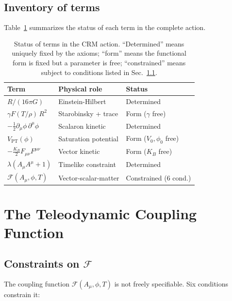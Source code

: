\documentclass[aps,prd,twocolumn,superscriptaddress,nofootinbib]{revtex4-2}
\begin{document}
\subsection{Inventory of terms}

Table~\ref{tab:terms} summarizes the status of each term in the complete action.

\begin{table}[b]
\caption{\label{tab:terms}Status of terms in the CRM action. ``Determined'' means uniquely fixed by the axioms; ``form'' means the functional form is fixed but a parameter is free; ``constrained'' means subject to conditions listed in Sec.~\ref{sec:constraints}.}
\begin{ruledtabular}
\begin{tabular}{lll}
Term & Physical role & Status \\
\hline
$R/(16\pi G)$ & Einstein-Hilbert & Determined \\
$\gamma F(T/\rho)\,R^2$ & Starobinsky + trace & Form ($\gamma$ free) \\
$-\frac{1}{2}\partial_\mu\phi\,\partial^\mu\phi$ & Scalaron kinetic & Determined \\
$V_{\mathrm{PT}}(\phi)$ & Saturation potential & Form ($V_0, \phi_0$ free) \\
$-\frac{K_B}{2}F_{\mu\nu}F^{\mu\nu}$ & Vector kinetic & Form ($K_B$ free) \\
$\lambda(A_\mu A^\mu + 1)$ & Timelike constraint & Determined \\
$\mathcal{F}(A_\mu, \phi, T)$ & Vector-scalar-matter & Constrained (6 cond.) \\
\end{tabular}
\end{ruledtabular}
\end{table}


\section{The Teleodynamic Coupling Function}
\label{sec:coupling}

\subsection{Constraints on $\mathcal{F}$}
\label{sec:constraints}

The coupling function $\mathcal{F}(A_\mu, \phi, T)$ is not freely specifiable. Six conditions constrain it:
\end{document}
